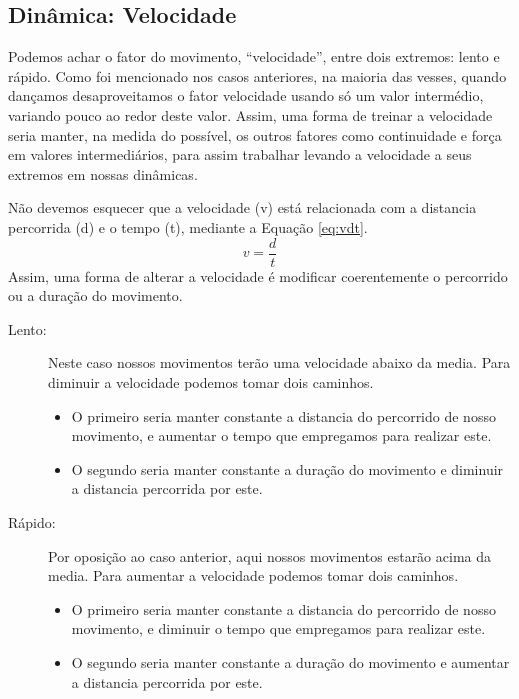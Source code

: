 \subsection{Dinâmica: Velocidade }
\label{subsec:dinamica:velocidade}


Podemos achar o fator do movimento, ``velocidade'', entre dois extremos: lento e  rápido.
Como foi mencionado nos casos anteriores, 
na maioria das vesses, 
quando dançamos desaproveitamos o fator velocidade usando só um valor intermédio,
variando  pouco ao redor deste valor.
Assim, uma forma de treinar a velocidade seria manter, na medida do possível,
os outros fatores como continuidade e força em valores intermediários,
para assim trabalhar levando a velocidade a seus extremos em nossas dinâmicas.

Não devemos esquecer que a velocidade (v) está relacionada com a distancia percorrida (d) e o tempo (t),
mediante a Equação \ref{eq:vdt}.
\begin{equation}
\label{eq:vdt}
v=\frac{d}{t}
\end{equation}
Assim, 
uma forma de alterar a velocidade é modificar coerentemente o percorrido ou a duração do movimento.


\begin{description}
\item[Lento:] Neste caso nossos movimentos terão uma velocidade abaixo da media.
Para diminuir a velocidade podemos tomar dois caminhos.
\begin{itemize}
\item O primeiro seria manter constante a distancia do percorrido de nosso movimento,
e aumentar o tempo que empregamos para realizar este.
\item O segundo seria manter constante a duração do movimento e diminuir a distancia percorrida por este. 
\end{itemize}
\item[Rápido:] Por oposição ao caso anterior, 
aqui nossos movimentos estarão acima da media.
Para aumentar a velocidade podemos tomar dois caminhos.
\begin{itemize}
\item O primeiro seria manter constante a distancia do percorrido de nosso movimento,
e diminuir o tempo que empregamos para realizar este.
\item O segundo seria manter constante a duração do movimento e aumentar a distancia percorrida por este. 
\end{itemize}
\end{description}

